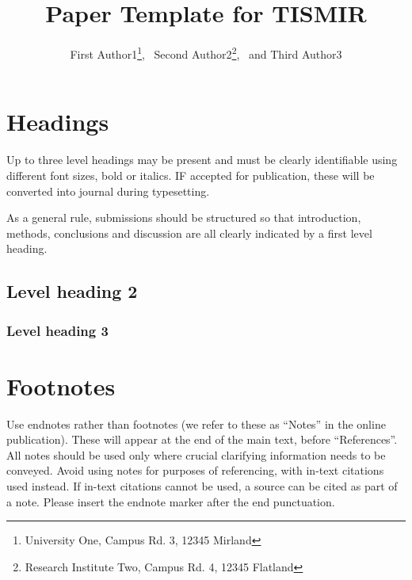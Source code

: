 \documentclass{article}
\title{Paper Template for TISMIR}
\author{%
First Author1\thanks{University One, Campus Rd. 3, 12345 Mirland},%
~Second Author2\thanks{Research Institute Two, Campus Rd. 4, 12345 Flatland},%
~and Third Author3\protect\footnotemark[1]}
\date{}
\begin{document}

\saythanks{}


\section{Headings}\label{sec:headings}

Up to three level headings may be present and must be clearly identifiable
using different font sizes, bold or italics. IF accepted for publication,
these will be converted into journal during typesetting.

As a general rule, submissions should be structured so that introduction,
methods, conclusions and discussion are all clearly indicated by a first level heading.

\subsection{Level heading 2}

\lipsum[1]

\subsubsection{Level heading 3}

\lipsum[2]

\section{Footnotes}\label{sec:footnotes}

Use endnotes rather than footnotes
(we refer to these as ``Notes'' in the online publication).
These will appear at the end of the main text, before ``References''.
All notes should be used only where crucial clarifying information
needs to be conveyed.
Avoid using notes for purposes of referencing, with in-text citations used
instead.
If in-text citations cannot be used, a source can be cited as part of a note.
Please insert the endnote marker after the end punctuation.
\end{document}
